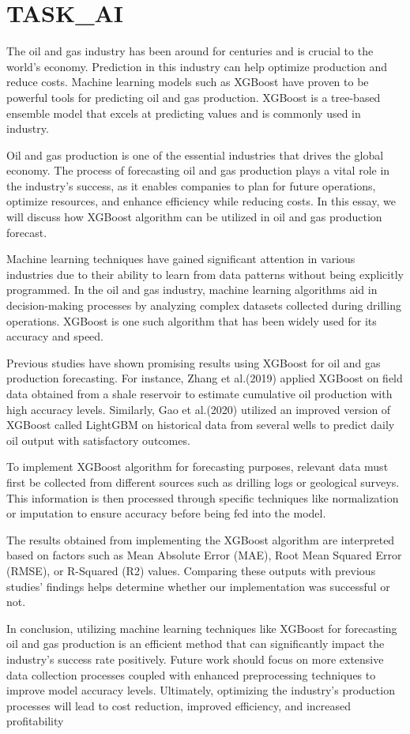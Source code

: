 \section{TASK_AI}
\label{sec:TASK_AI}

The oil and gas industry has been around for centuries and is crucial to the world's economy. Prediction in this industry can help optimize production and reduce costs. Machine learning models such as XGBoost have proven to be powerful tools for predicting oil and gas production. XGBoost is a tree-based ensemble model that excels at predicting values and is commonly used in industry.


Oil and gas production is one of the essential industries that drives the global economy.
The process of forecasting oil and gas production plays a vital role in the industry's success, as it
enables companies to plan for future operations, optimize resources, and enhance efficiency
while reducing costs. In this essay, we will discuss how XGBoost algorithm can be utilized in oil
and gas production forecast.

Machine learning techniques have gained significant attention in various industries due to
their ability to learn from data patterns without being explicitly programmed. In the oil and gas
industry, machine learning algorithms aid in decision-making processes by analyzing complex
datasets collected during drilling operations. XGBoost is one such algorithm that has been
widely used for its accuracy and speed.

Previous studies have shown promising results using XGBoost for oil and gas production
forecasting. For instance, Zhang et al.(2019) applied XGBoost on field data obtained from a
shale reservoir to estimate cumulative oil production with high accuracy levels. Similarly, Gao et
al.(2020) utilized an improved version of XGBoost called LightGBM on historical data from
several wells to predict daily oil output with satisfactory outcomes.


To implement XGBoost algorithm for forecasting purposes, relevant data must first be
collected from different sources such as drilling logs or geological surveys. This information is
then processed through specific techniques like normalization or imputation to ensure accuracy
before being fed into the model.

The results obtained from implementing the XGBoost algorithm are interpreted based on
factors such as Mean Absolute Error (MAE), Root Mean Squared Error (RMSE), or R-Squared
(R2) values. Comparing these outputs with previous studies' findings helps determine whether
our implementation was successful or not.

In conclusion, utilizing machine learning techniques like XGBoost for forecasting oil and
gas production is an efficient method that can significantly impact the industry's success rate
positively. Future work should focus on more extensive data collection processes coupled with
enhanced preprocessing techniques to improve model accuracy levels. Ultimately, optimizing the
industry's production processes will lead to cost reduction, improved efficiency, and increased
profitability